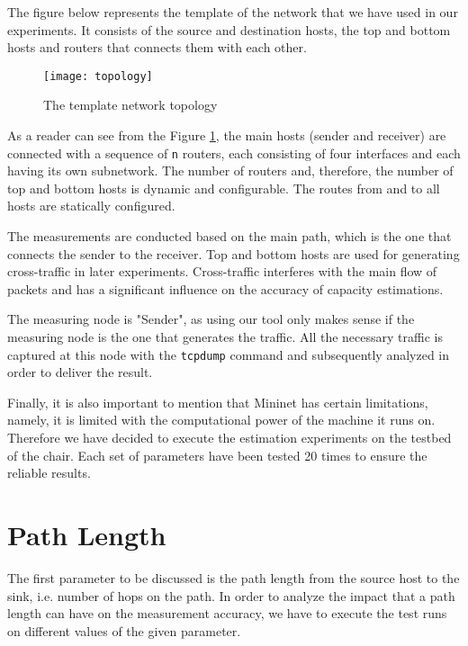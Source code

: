 The figure below represents the template of the network that we have used in our experiments. It consists of the source and destination hosts, the top and bottom hosts and routers that connects them with each other. \\




\begin{figure}[htp]
 \centering
	 \texttt{[image: topology]}
 \caption{The template network topology}
 \label{topology}

\end{figure}


As a reader can see from the Figure \ref{topology}, the main hosts (sender and receiver) are connected with a sequence of \texttt{n} routers, each consisting of four interfaces and each having its own subnetwork. The number of routers and, therefore, the number of top and bottom hosts is dynamic and configurable. The routes from and to all hosts are statically configured.

The measurements are conducted based on the main path, which is the one that connects the sender to the receiver. Top and bottom hosts are used for generating cross-traffic in later experiments. Cross-traffic interferes with the main flow of packets and has a significant influence on the accuracy of capacity estimations.  

The measuring node is "Sender", as using our tool only makes sense if the measuring node is the one that generates the traffic. All the necessary traffic is captured at this node with the \texttt{tcpdump} command and subsequently analyzed in order to deliver the result.

Finally, it is also important to mention that Mininet has certain limitations, namely, it is limited with the computational power of the machine it runs on. Therefore we have decided to execute the estimation experiments on the testbed of the chair.
Each set of parameters have been tested 20 times to ensure the reliable results.

\section{Path Length}
The first parameter to be discussed is the path length from the source host to the sink, i.e. number of hops on the path. In order to analyze the impact that a path length can have on the measurement accuracy, we have to execute the test runs on different values of the given parameter. 

